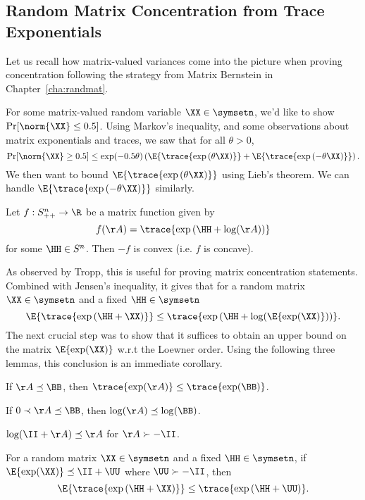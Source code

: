 \subsection{Random Matrix Concentration from Trace Exponentials}
Let us recall how matrix-valued variances come into the picture when
proving concentration following the strategy from Matrix Bernstein in
Chapter~\ref{cha:randmat}.

For some matrix-valued random variable $\XX \in \symsetn$,
we'd like to show $\Pr[ \norm{\XX} \leq 0.5 ]$.
Using Markov's inequality, and some observations about matrix
exponentials and traces, we saw that for all $\theta > 0$,
\begin{equation}
  \label{eq:masterprob}
  \Pr[ \norm{\XX} \geq 0.5 ]
  \leq
  \exp(-0.5\theta ) \left(\E{\trace{ \exp\left(\theta \XX\right)}}
  +
  \E{\trace{ \exp\left(-\theta \XX\right)}}
  \right)
  .
\end{equation}
We then want to bound $\E{\trace{ \exp\left(\theta \XX\right)}}$
using Lieb's theorem.
We can handle $\E{\trace{ \exp\left(-\theta \XX\right)}}$ similarly.
\begin{theorem}[Lieb]
  \label{thm:Lieb}
  Let $f:S^n_{++}\to\R$ be a matrix function given by
  \[ f(\AA) = \trace{\exp\left(\HH+\log(\AA)\right)} \]
  for some $\HH\in S^n$. Then $-f$ is convex (i.e. $f$ is concave).
\end{theorem}
As observed by Tropp, this is useful for proving matrix concentration statements.
Combined with Jensen's inequality, it gives that for a random matrix
$\XX \in \symsetn $ and a fixed $\HH \in \symsetn$
\[
  \E{\trace{ \exp\left(\HH+\XX\right)}}
    \leq
    \trace{ \exp\left(\HH+\log(\E{\exp(\XX)})\right)}
  .
\]
The next crucial step was to show that it suffices to obtain an upper
bound on the matrix $\E{\exp(\XX)}$ w.r.t the Loewner order.
Using the following three lemmas, this conclusion is an immediate
corollary.
\begin{lemma}\label{lem:trexpmono}
  If $\AA\preceq\BB$, then $\trace{\exp(\AA)}\leq\trace{\exp(\BB)}$.
\end{lemma}
\begin{lemma}\label{lem:logmono}
  If $0\prec\AA\preceq\BB$, then $\log(\AA)\preceq\log(\BB)$.
\end{lemma}
\begin{lemma}\label{lem:ineq_log}
  $\log(\II+\AA) \preceq \AA$ for $\AA\succ-\II$.
\end{lemma}
%
\begin{corollary}
  \label{cor:trexpub}
  For a random matrix
  $\XX \in \symsetn $ and a fixed $\HH \in \symsetn$,
  if $\E{\exp(\XX)} \preceq \II + \UU$ where $\UU \succ -\II$, then
\[
  \E{\trace{ \exp\left(\HH+\XX\right)}}
    \leq
    \trace{ \exp\left(\HH+\UU\right)}
  .
\]
\end{corollary}

